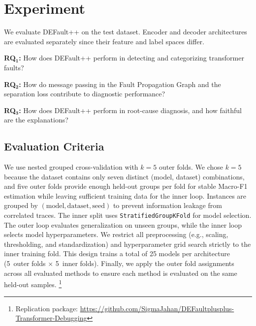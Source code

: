 \section{Experiment}
\label{sec:defaultpp_experiment}

We evaluate DEFault++ on the test dataset. Encoder and decoder architectures are evaluated separately since their feature and label spaces differ.

\begin{rqlist}
\item \textbf{RQ$\mathbf{_1}$:} How does DEFault++ perform in detecting and categorizing transformer faults?
\item \textbf{RQ$\mathbf{_2}$:} How do message passing in the Fault Propagation Graph and the separation loss contribute to diagnostic performance?
\item \textbf{RQ$\mathbf{_3}$:} How does DEFault++ perform in root-cause diagnosis, and how faithful are the explanations?
\end{rqlist}

\subsection{Evaluation Criteria}
\label{sec:defaultpp_cv}

We use nested grouped cross-validation with $k=5$ outer folds. We chose $k=5$ because the dataset contains only seven distinct (model, dataset) combinations, and five outer folds provide enough held-out groups per fold for stable Macro-F1 estimation while leaving sufficient training data for the inner loop. Instances are grouped by $(\text{model}, \text{dataset}, \text{seed})$ to prevent information leakage from correlated traces. The inner split uses \texttt{StratifiedGroupKFold} for model selection. The outer loop evaluates generalization on unseen groups, while the inner loop selects model hyperparameters. We restrict all preprocessing (e.g., scaling, thresholding, and standardization) and hyperparameter grid search strictly to the inner training fold. This design trains a total of 25 models per architecture (5~outer folds $\times$ 5~inner folds). Finally, we apply the outer fold assignments across all evaluated methods to ensure each method is evaluated on the same held-out samples. \footnote{Replication package: \url{https://github.com/SigmaJahan/DEFaultplusplus-Transformer-Debugging}}

